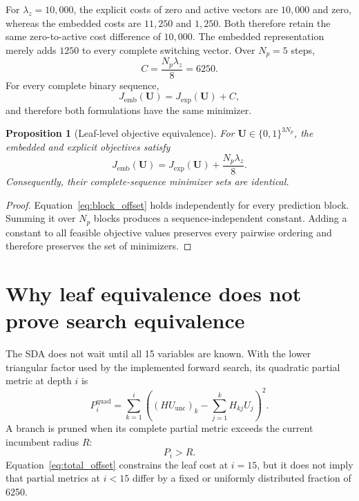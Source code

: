 \documentclass[paper=a4,oneside,fontsize=12pt,DIV=14,headings=normal,parskip=half,headsepline,numbers=noendperiod]{scrreprt}
\newcommand{\vct}[1]{\bm{#1}}
\newtheorem{proposition}{Proposition}[chapter]
\begin{document}
For $\lambda_z=10{,}000$, the explicit costs of zero and active vectors are
$10{,}000$ and zero, whereas the embedded costs are $11{,}250$ and $1{,}250$.
Both therefore retain the same zero-to-active cost difference of $10{,}000$.
The embedded representation merely adds $1250$ to every complete switching
vector.  Over $N_p=5$ steps,
\begin{equation}
 C=\frac{N_p\lambda_z}{8}=6250.
 \label{eq:total_offset}
\end{equation}
For every complete binary sequence,
\begin{equation}
 J_{\mathrm{emb}}(\vct U)=J_{\mathrm{exp}}(\vct U)+C,
\end{equation}
and therefore both formulations have the same minimizer.

\begin{proposition}[Leaf-level objective equivalence]
For $\vct U\in\{0,1\}^{3N_p}$, the embedded and explicit objectives satisfy
\begin{equation}
 J_{\mathrm{emb}}(\vct U)
 =J_{\mathrm{exp}}(\vct U)+\frac{N_p\lambda_z}{8}.
\end{equation}
Consequently, their complete-sequence minimizer sets are identical.
\end{proposition}
\begin{proof}
Equation~\eqref{eq:block_offset} holds independently for every prediction
block.  Summing it over $N_p$ blocks produces a sequence-independent constant.
Adding a constant to all feasible objective values preserves every pairwise
ordering and therefore preserves the set of minimizers.
\end{proof}

\section{Why leaf equivalence does not prove search equivalence}
The SDA does not wait until all 15 variables are known.  With the lower
triangular factor used by the implemented forward search, its quadratic partial
metric at depth $i$ is
\begin{equation}
 P_i^{\mathrm{quad}}
 =\sum_{k=1}^{i}
 \left(
  (H U_{\mathrm{unc}})_k-
  \sum_{j=1}^{k}H_{kj}U_j
 \right)^2.
 \label{eq:quadratic_partial}
\end{equation}
A branch is pruned when its complete partial metric exceeds the current
incumbent radius $R$:
\begin{equation}
 P_i>R.
 \label{eq:prune_rule}
\end{equation}
Equation~\eqref{eq:total_offset} constrains the leaf cost at $i=15$, but it
does not imply that partial metrics at $i<15$ differ by a fixed or uniformly
distributed fraction of 6250.
\end{document}
